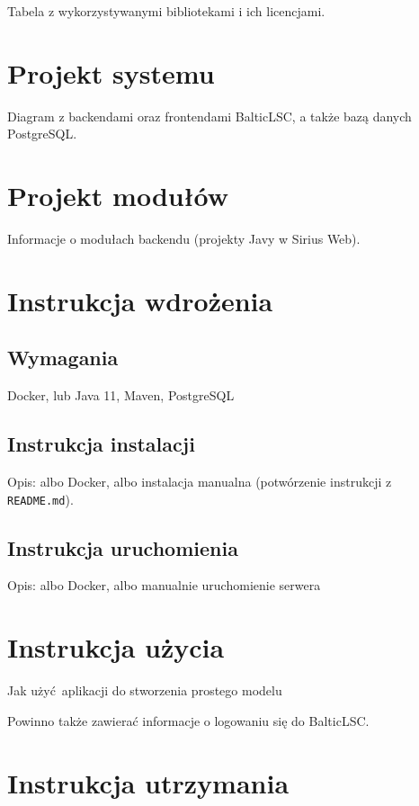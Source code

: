 Tabela z wykorzystywanymi bibliotekami i ich licencjami.

\section{Projekt systemu}

Diagram z backendami oraz frontendami BalticLSC, a także bazą danych
PostgreSQL\@.

\section{Projekt modułów}

Informacje o modułach backendu (projekty Javy w Sirius Web).

\section{Instrukcja wdrożenia}

\subsection{Wymagania}

Docker, lub Java 11, Maven, PostgreSQL

\subsection{Instrukcja instalacji}

Opis: albo Docker, albo instalacja manualna (potwórzenie instrukcji z
\texttt{README.md}).

\subsection{Instrukcja uruchomienia}

Opis: albo Docker, albo manualnie uruchomienie serwera

\section{Instrukcja użycia}

Jak użyć aplikacji do stworzenia prostego modelu

Powinno także zawierać informacje o logowaniu się do BalticLSC\@.

\section{Instrukcja utrzymania}

